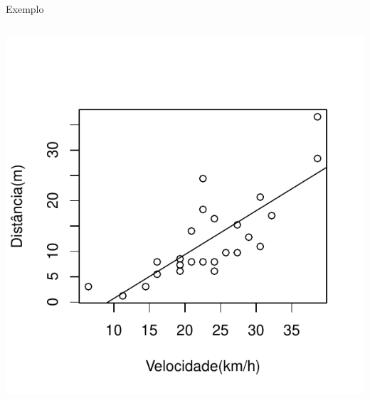 \documentclass{beamer}\usepackage[]{graphicx}\usepackage[]{color}
\newenvironment{knitrout}{}{} %
\renewenvironment{knitrout}{\setlength{\topsep}{0mm}}{}
\begin{document}
\begin{frame}[fragile]{Exemplo}
\begin{columns}[c]
\begin{knitrout}
\includegraphics[width=.7\linewidth]{figure/v6-2} 

\end{knitrout}

\end{columns}

\end{frame}
\end{document}
